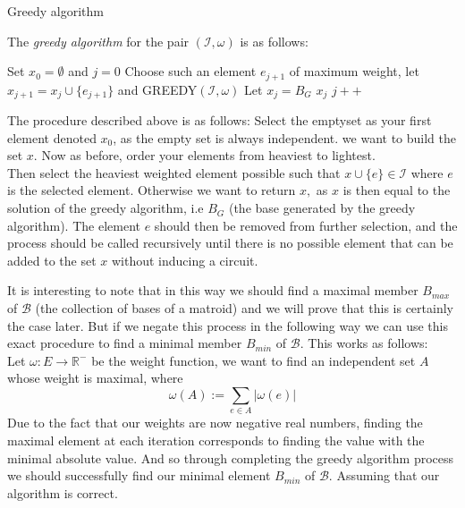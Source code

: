 \documentclass[../main.tex]{subfiles}
\begin{document}
\begin{algorithm}[H]
\caption{Greedy algorithm}\label{matroid_ver}
The \textit{greedy algorithm} for the pair $(\mathcal{I}, \omega)$ is as follows:
\begin{algorithmic}[1]
\State Set $x_0 = \emptyset$ and $j=0$
\State Choose such an element $e_{j+1}$ of maximum weight,
\State let $x_{j+1} = x_j \cup \{e_{j+1}\}$ and
\State GREEDY$(\mathcal{I}, \omega)$
\Else 
\State Let $x_j = B_G$
\State\Return $x_j$
\EndIf
\State $j++$
\EndProcedure
\end{algorithmic}
\end{algorithm}

\noindent The procedure described above is as follows: Select the emptyset as your first element denoted $x_0$, as the empty set is always independent. we want to build the set $x.$ Now as before, order your elements from heaviest to lightest.\\
Then select the heaviest weighted element possible such that $x \cup \{e\} \in \mathcal{I}$ where $e$ is the selected element. Otherwise we want to return $x,$ as $x$ is then equal to the solution of the greedy algorithm, i.e $B_G$ (the base generated by the greedy algorithm). The element $e$ should then be removed from further selection, and the process should be called recursively until there is no possible element that can be added to the set $x$ without inducing a circuit.

\begin{rem}
It is interesting to note that in this way we should find a maximal member $B_{max}$ of $\mathcal{B}$ (the collection of bases of a matroid) and we will prove that this is certainly the case later. But if we negate this process in the following way we can use this exact procedure to find a minimal member $B_{min}$ of $\mathcal{B}.$ This works as follows:\\
Let $\omega : E \longrightarrow \mathbb{R^{-}}$ be the weight function, we want to find an independent set $A$ whose weight is maximal, where
\begin{equation}
\omega(A) := \sum_{e \in A} |\omega (e)|
\end{equation}
Due to the fact that our weights are now negative real numbers, finding the maximal element at each iteration corresponds to finding the value with the minimal absolute value. And so through completing the greedy algorithm process we should successfully find our minimal element $B_{min}$ of $\mathcal{B}.$ Assuming that our algorithm is correct.
\end{rem}
\end{document}
